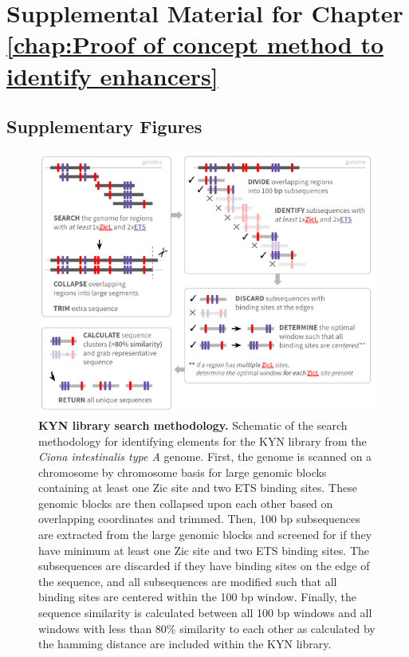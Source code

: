 \chapter{Supplemental Material for Chapter \ref{chap:Proof of concept method to identify enhancers}}

\section{Supplementary Figures}

\begin{figure}[h]
    \centering
    \includegraphics[scale=.5]{3_figures-and-files/FigS1_KYN-Search.png}
    \caption[KYN library search methodology]{\textbf{KYN library search methodology.} Schematic of the search methodology for identifying elements for the KYN library from the \textit{Ciona intestinalis type A} genome. First, the genome is scanned on a chromosome by chromosome basis for large genomic blocks containing at least one Zic site and two ETS binding sites. These genomic blocks are then collapsed upon each other based on overlapping coordinates and trimmed. Then, 100 bp subsequences are extracted from the large genomic blocks and screened for if they have minimum at least one Zic site and two ETS binding sites. The subsequences are discarded if they have binding sites on the edge of the sequence, and all subsequences are modified such that all binding sites are centered within the 100 bp window. Finally, the sequence similarity is calculated between all 100 bp windows and all windows with less than 80\% similarity to each other as calculated by the hamming distance are included within the KYN library.}
    \label{fig:supplement kyn library search}
\end{figure}

